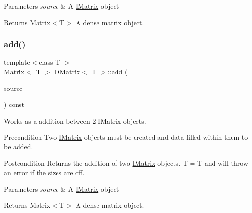 \begin{DoxyParams}{Parameters}
{\em source} & A \mbox{\hyperlink{class_i_matrix}{I\+Matrix}} object \\
\hline
\end{DoxyParams}
\begin{DoxyReturn}{Returns}
Matrix$<$\+T$>$ A dense matrix object. 
\end{DoxyReturn}
\mbox{\label{class_d_matrix_a93d315343751e59b20c5ee07b23f35c9}} 
\subsubsection{\texorpdfstring{add()}{add()}\hspace{0.1cm}{\footnotesize\ttfamily [5/6]}}
{\footnotesize\ttfamily template$<$class T $>$ \\
\mbox{\hyperlink{class_matrix}{Matrix}}$<$ T $>$ \mbox{\hyperlink{class_d_matrix}{D\+Matrix}}$<$ T $>$\+::add (\begin{DoxyParamCaption}\item[{const \mbox{\hyperlink{class_i_matrix}{I\+Matrix}}$<$ \mbox{\hyperlink{class_s_matrix}{S\+Matrix}}$<$ T $>$, T $>$ \&}]{source }\end{DoxyParamCaption}) const}



Works as a addition between 2 \mbox{\hyperlink{class_i_matrix}{I\+Matrix}} objects. 

\begin{DoxyPrecond}{Precondition}
Two \mbox{\hyperlink{class_i_matrix}{I\+Matrix}} objects must be created and data filled within them to be added. 
\end{DoxyPrecond}
\begin{DoxyPostcond}{Postcondition}
Returns the addition of two \mbox{\hyperlink{class_i_matrix}{I\+Matrix}} objects. T = T and will throw an error if the sizes are off.
\end{DoxyPostcond}

\begin{DoxyParams}{Parameters}
{\em source} & A \mbox{\hyperlink{class_i_matrix}{I\+Matrix}} object \\
\hline
\end{DoxyParams}
\begin{DoxyReturn}{Returns}
Matrix$<$\+T$>$ A dense matrix object. 
\end{DoxyReturn}
\mbox{\label{class_d_matrix_ab2ccdeb68a73333d16d6bdae272ca437}} 
